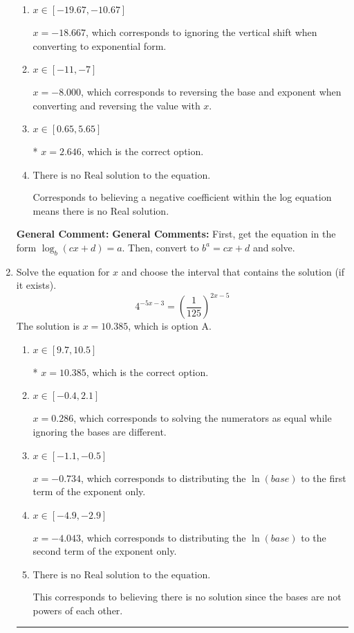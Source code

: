 \documentclass{extbook}[14pt]
\newcommand{\litem}[1]{\item #1

\rule{\textwidth}{0.4pt}}
\begin{document}
\begin{enumerate}
{\begin{enumerate}[label=\Alph*.]
$x = -2.667$, which corresponds to reversing the base and exponent when converting.
\item \( x \in [-19.67, -10.67] \)

$x = -18.667$, which corresponds to ignoring the vertical shift when converting to exponential form.
\item \( x \in [-11, -7] \)

$x = -8.000$, which corresponds to reversing the base and exponent when converting and reversing the value with $x$.
\item \( x \in [0.65, 5.65] \)

* $x = 2.646$, which is the correct option.
\item \( \text{There is no Real solution to the equation.} \)

Corresponds to believing a negative coefficient within the log equation means there is no Real solution.
\end{enumerate}

\textbf{General Comment:} \textbf{General Comments:} First, get the equation in the form $\log_b{(cx+d)} = a$. Then, convert to $b^a = cx+d$ and solve.
}
\litem{
Solve the equation for $x$ and choose the interval that contains the solution (if it exists).
\[ 4^{-5x-3} = \left(\frac{1}{125}\right)^{2x-5} \]The solution is \( x = 10.385 \), which is option A.\begin{enumerate}[label=\Alph*.]
\item \( x \in [9.7, 10.5] \)

* $x = 10.385$, which is the correct option.
\item \( x \in [-0.4, 2.1] \)

$x = 0.286$, which corresponds to solving the numerators as equal while ignoring the bases are different.
\item \( x \in [-1.1, -0.5] \)

$x = -0.734$, which corresponds to distributing the $\ln(base)$ to the first term of the exponent only.
\item \( x \in [-4.9, -2.9] \)

$x = -4.043$, which corresponds to distributing the $\ln(base)$ to the second term of the exponent only.
\item \( \text{There is no Real solution to the equation.} \)

This corresponds to believing there is no solution since the bases are not powers of each other.
\end{enumerate}

}
\end{enumerate}
\end{document}
